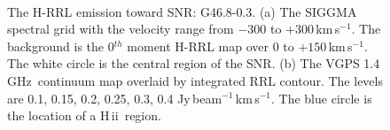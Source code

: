 \documentclass[manuscript]{aastex61}
\newcommand{\hii}{{\rm H\,}{{\sc ii}}}
\newcommand{\kms}{\,km\,s$^{-1}$}
\newcommand{\ghz}{\,GHz}
\begin{document}
\begin{figure}[H]
	\centering
	\\
	\caption{The H-RRL emission toward SNR: G46.8-0.3.
	(a) The SIGGMA spectral grid with the velocity range from $-300$ to $+300$\kms.
	The background is the 0$^{th}$ moment H-RRL map over $0$ to $+150$\kms.
	The white circle is the central region of the SNR.
	(b) The VGPS 1.4\ghz\ continuum map overlaid by integrated RRL contour.
	The levels are 0.1, 0.15, 0.2, 0.25, 0.3, 0.4 Jy\,beam$^{-1}$\kms.
	The blue circle is the location of a \hii\ region.
	}
	\label{fig_snr-g468}
\end{figure}
\end{document}
